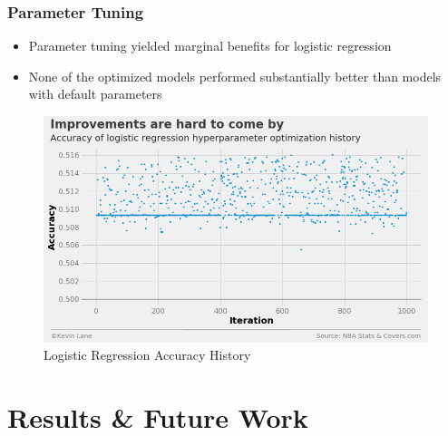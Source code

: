 \documentclass{beamer}
\begin{document}
\begin{frame}
\frametitle{Parameter Tuning}
\begin{itemize}
    \item Parameter tuning yielded marginal benefits for logistic regression
    \item None of the optimized models performed substantially better than models with default parameters
\end{itemize}
\begin{figure}
\includegraphics[scale=0.3]{../docs/assets/images/parameter-tuning/logistic-regression-accuracy.png}
\caption{Logistic Regression Accuracy History}
\end{figure}
\end{frame}

\section{Results \& Future Work}
\end{document}
